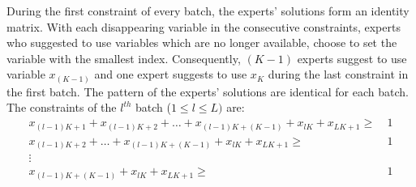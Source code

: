 During the first constraint of every batch, the experts' solutions form an identity matrix. With each disappearing variable in the consecutive constraints, experts who suggested to use variables which are no longer available, choose to set the variable with the smallest index. Consequently, $(K-1)$ experts suggest to use variable $x_{(K-1)}$ and one expert suggests to use $x_K$ during the last constraint in the first batch. The pattern of the experts' solutions are identical for each batch. The constraints of the $l^{th}$ batch ($ 1 \le l \le L)$ are:
%
\begin{align*}
     x_{(l-1) K + 1} + x_{(l-1) K + 2} + \dots + x_{(l-1) K + (K-1)} + x_{lK} + x_{LK+1} \ge & \ 1\\
     x_{(l-1) K + 2} + \dots + x_{(l-1) K + (K-1)} + x_{lK} + x_{LK+1} \ge & \ 1\\
     \vdots &\\
     x_{(l-1) K + (K-1)} + x_{lK} + x_{LK+1} \ge & \ 1\\
\end{align*}
%

